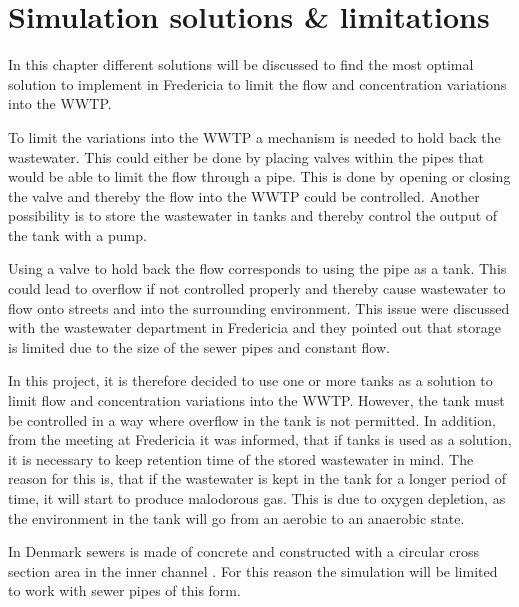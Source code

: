 
\chapter{Simulation solutions \& limitations }\label{ch:simulation_solution_and_limitation}
In this chapter different solutions will be discussed to find the most optimal solution to implement in Fredericia to limit the flow and concentration variations into the WWTP.

To limit the variations into the WWTP a mechanism is needed to hold back the wastewater. This could either be done by placing valves within the pipes that would be able to limit the flow through a pipe. This is done by opening or closing the valve and thereby the flow into the WWTP could be controlled. Another possibility is to store the wastewater in tanks and thereby control the output of the tank with a pump. 

Using a valve to hold back the flow corresponds to using the pipe as a tank. This could lead to overflow if not controlled properly and thereby cause wastewater to flow onto streets and into the surrounding environment. %
This issue were discussed with the wastewater department in Fredericia and they pointed out that storage is limited due to the size of the sewer pipes and constant flow. 

In this project, it is therefore decided to use one or more tanks as a solution to limit flow and concentration variations into the WWTP. %
However, the tank must be controlled in a way where overflow in the tank is not permitted. %
In addition, from the meeting at Fredericia it was informed, that if tanks is used as a solution, it is necessary to keep retention time of the stored wastewater in mind. The reason for this is, that if the wastewater is kept in the tank for a longer period of time, it will start to produce malodorous gas. This is due to oxygen depletion, as the environment in the tank will go from an aerobic to an anaerobic state. 

In Denmark sewers is made of concrete and constructed with a circular cross section area in the inner channel \cite{betonhaandbogen}. For this reason the simulation will be limited to work with sewer pipes of this form.


